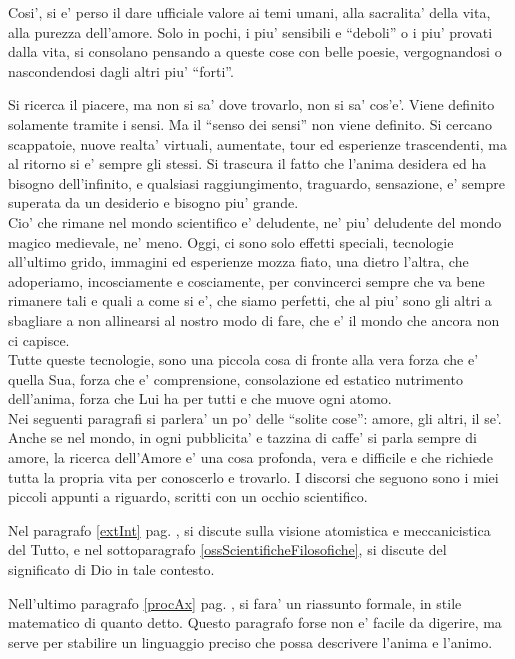 Cosi', si e' perso il dare ufficiale valore ai temi umani, alla sacralita' della vita, alla purezza dell'amore. Solo in pochi, i piu' sensibili e ``deboli'' o i piu' provati dalla vita, si consolano pensando a queste cose con belle poesie, vergognandosi o nascondendosi dagli altri piu' ``forti''.

Si ricerca il piacere, ma non si sa' dove trovarlo, non si sa' cos'e'. Viene definito solamente tramite i sensi. Ma il ``senso dei sensi'' non viene definito. Si cercano scappatoie, nuove realta' virtuali, aumentate, tour ed esperienze trascendenti, ma al ritorno si e' sempre gli stessi. Si trascura il fatto che l'anima desidera ed ha bisogno dell'infinito, e qualsiasi raggiungimento, traguardo, sensazione, e' sempre superata da un desiderio e bisogno piu' grande.\\
Cio' che rimane nel mondo scientifico e' deludente, ne' piu' deludente del mondo magico medievale, ne' meno. Oggi, ci sono solo effetti speciali, tecnologie all'ultimo grido, immagini ed esperienze mozza fiato, una dietro l'altra, che adoperiamo, incosciamente e cosciamente, per convincerci sempre che va bene rimanere tali e quali a come si e', che siamo perfetti, che al piu' sono gli altri a sbagliare a non allinearsi al nostro modo di fare, che e' il mondo che ancora non ci capisce.\\
Tutte queste tecnologie, sono una piccola cosa di fronte alla vera forza che e' quella Sua, forza che e' comprensione, consolazione ed estatico nutrimento dell'anima, forza che Lui ha per tutti e che muove ogni atomo.\\

Nei seguenti paragrafi si parlera' un po' delle ``solite cose'': amore, gli altri, il se'. Anche se nel mondo, in ogni pubblicita' e tazzina di caffe' si parla sempre di amore, la ricerca dell'Amore e' una cosa profonda, vera e difficile e che richiede tutta la propria vita per conoscerlo e trovarlo. I discorsi che seguono sono i miei piccoli appunti a riguardo, scritti con un occhio scientifico.

Nel paragrafo \ref{extInt} pag. \pageref{extInt}, si discute sulla visione atomistica e meccanicistica del Tutto, e nel sottoparagrafo \ref{ossScientificheFilosofiche}, si discute del significato di Dio in tale contesto.

Nell'ultimo paragrafo \ref{procAx} pag. \pageref{procAx}, si fara' un riassunto formale, in stile matematico di quanto detto. Questo paragrafo forse non e' facile da digerire, ma serve per stabilire un linguaggio preciso che possa descrivere l'anima e l'animo.


